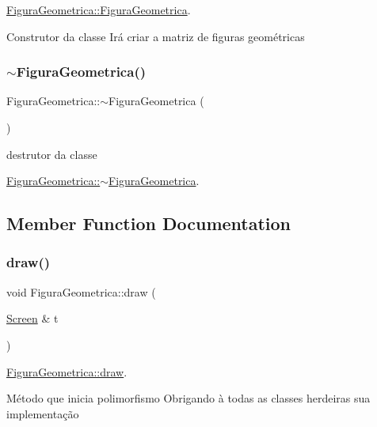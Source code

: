 \hyperlink{classFiguraGeometrica_a81d7c7efaea511e60a15f5a363138dd9}{Figura\+Geometrica\+::\+Figura\+Geometrica}. 

Construtor da classe Irá criar a matriz de figuras geométricas \mbox{\label{classFiguraGeometrica_ad13b9bccf1b14f6b9fbc662aad61ffd1}} 
\subsubsection{\texorpdfstring{$\sim$\+Figura\+Geometrica()}{~FiguraGeometrica()}}
{\footnotesize\ttfamily Figura\+Geometrica\+::$\sim$\+Figura\+Geometrica (\begin{DoxyParamCaption}{ }\end{DoxyParamCaption})}



destrutor da classe 

\hyperlink{classFiguraGeometrica_ad13b9bccf1b14f6b9fbc662aad61ffd1}{Figura\+Geometrica\+::$\sim$\+Figura\+Geometrica}. 

\subsection{Member Function Documentation}
\mbox{\label{classFiguraGeometrica_a06404670d06d28d12f5f386901186925}} 
\subsubsection{\texorpdfstring{draw()}{draw()}}
{\footnotesize\ttfamily void Figura\+Geometrica\+::draw (\begin{DoxyParamCaption}\item[{\hyperlink{classScreen}{Screen} \&}]{t }\end{DoxyParamCaption})\hspace{0.3cm}{\ttfamily [pure virtual]}}



\hyperlink{classFiguraGeometrica_a06404670d06d28d12f5f386901186925}{Figura\+Geometrica\+::draw}. 

Método que inicia polimorfismo Obrigando à todas as classes herdeiras sua implementação


